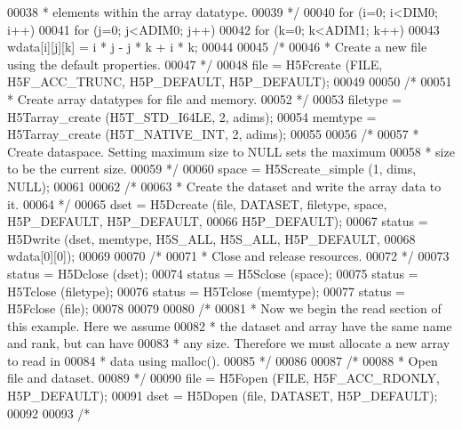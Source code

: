 \begin{DoxyCode}
00038 \textcolor{comment}{     * elements within the array datatype.}
00039 \textcolor{comment}{     */}
00040     \textcolor{keywordflow}{for} (i=0; i<DIM0; i++)
00041         \textcolor{keywordflow}{for} (j=0; j<ADIM0; j++)
00042             \textcolor{keywordflow}{for} (k=0; k<ADIM1; k++)
00043                 wdata[i][j][k] = i * j - j * k + i * k;
00044 
00045     \textcolor{comment}{/*}
00046 \textcolor{comment}{     * Create a new file using the default properties.}
00047 \textcolor{comment}{     */}
00048     file = H5Fcreate (FILE, H5F\_ACC\_TRUNC, H5P\_DEFAULT, H5P\_DEFAULT);
00049 
00050     \textcolor{comment}{/*}
00051 \textcolor{comment}{     * Create array datatypes for file and memory.}
00052 \textcolor{comment}{     */}
00053     filetype = H5Tarray\_create (H5T\_STD\_I64LE, 2, adims);
00054     memtype = H5Tarray\_create (H5T\_NATIVE\_INT, 2, adims);
00055 
00056     \textcolor{comment}{/*}
00057 \textcolor{comment}{     * Create dataspace.  Setting maximum size to NULL sets the maximum}
00058 \textcolor{comment}{     * size to be the current size.}
00059 \textcolor{comment}{     */}
00060     space = H5Screate\_simple (1, dims, NULL);
00061 
00062     \textcolor{comment}{/*}
00063 \textcolor{comment}{     * Create the dataset and write the array data to it.}
00064 \textcolor{comment}{     */}
00065     dset = H5Dcreate (file, DATASET, filetype, space, H5P\_DEFAULT, H5P\_DEFAULT,
00066                 H5P\_DEFAULT);
00067     status = H5Dwrite (dset, memtype, H5S\_ALL, H5S\_ALL, H5P\_DEFAULT,
00068                 wdata[0][0]);
00069 
00070     \textcolor{comment}{/*}
00071 \textcolor{comment}{     * Close and release resources.}
00072 \textcolor{comment}{     */}
00073     status = H5Dclose (dset);
00074     status = H5Sclose (space);
00075     status = H5Tclose (filetype);
00076     status = H5Tclose (memtype);
00077     status = H5Fclose (file);
00078 
00079 
00080     \textcolor{comment}{/*}
00081 \textcolor{comment}{     * Now we begin the read section of this example.  Here we assume}
00082 \textcolor{comment}{     * the dataset and array have the same name and rank, but can have}
00083 \textcolor{comment}{     * any size.  Therefore we must allocate a new array to read in}
00084 \textcolor{comment}{     * data using malloc().}
00085 \textcolor{comment}{     */}
00086 
00087     \textcolor{comment}{/*}
00088 \textcolor{comment}{     * Open file and dataset.}
00089 \textcolor{comment}{     */}
00090     file = H5Fopen (FILE, H5F\_ACC\_RDONLY, H5P\_DEFAULT);
00091     dset = H5Dopen (file, DATASET, H5P\_DEFAULT);
00092 
00093     \textcolor{comment}{/*}

\end{DoxyCode}
